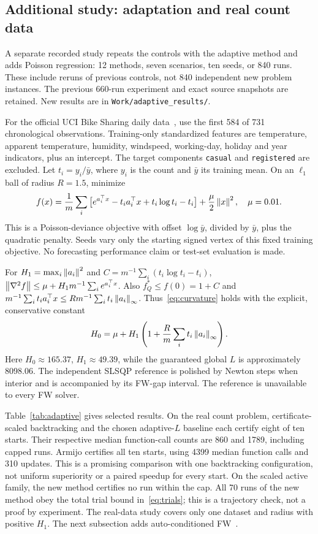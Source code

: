 \subsection{Additional study: adaptation and real count data}
A separate recorded study repeats the controls with the adaptive method
and adds Poisson regression: 12 methods, seven scenarios, ten seeds, or
840 runs. These include reruns of previous controls, not 840 independent
new problem instances. The previous 660-run experiment and exact source
snapshots are retained. New results are in \texttt{Work/adaptive\_results/}.

For the official UCI Bike Sharing daily data~\cite{bike}, use the first
584 of 731 chronological observations. Training-only standardized
features are temperature, apparent temperature, humidity, windspeed,
working-day, holiday and year indicators, plus an intercept. The target
components \texttt{casual} and \texttt{registered} are excluded.
Let $t_i=y_i/\bar y$, where $y_i$ is the count and $\bar y$ its training
mean. On an $\ell_1$ ball of radius $R=1.5$, minimize
\[
 f(x)=\frac1m\sum_i\big[e^{a_i^\top x}-t_i a_i^\top x
                         +t_i\log t_i-t_i\big]+\frac\mu2\left\|x\right\|^2,
 \quad \mu=0.01.
\]
This is a Poisson-deviance objective with offset $\log\bar y$, divided
by $\bar y$, plus the quadratic penalty. Seeds vary only the starting
signed vertex of this fixed training objective. No forecasting performance
claim or test-set evaluation is made.

For $H_1=\max_i\left\|a_i\right\|^2$ and $C=m^{-1}\sum_i(t_i\log t_i-t_i)$,
$\left\|\nabla^2f\right\|\le\mu+H_1m^{-1}\sum_i e^{a_i^\top x}$.
Also $f_Q^*\le f(0)=1+C$ and
$m^{-1}\sum_i t_i a_i^\top x\le Rm^{-1}\sum_i t_i\left\|a_i\right\|_\infty$.
Thus~\eqref{eq:curvature} holds with the explicit, conservative constant
\[
 H_0=\mu+H_1\left(1+\frac Rm\sum_i t_i\left\|a_i\right\|_\infty\right).
\]
Here $H_0\approx165.37$, $H_1\approx49.39$, while the guaranteed global
$L$ is approximately 8098.06. The independent SLSQP reference is polished
by Newton steps when interior and is accompanied by its FW-gap interval.
The reference is unavailable to every FW solver.

Table~\ref{tab:adaptive} gives selected results. On the real count
problem, certificate-scaled backtracking and the chosen adaptive-$L$
baseline each certify eight of ten starts. Their respective median
function-call counts are 860 and 1789, including capped runs.
Armijo certifies all ten starts, using 4399 median function calls and
310 updates. This is a promising comparison with one backtracking
configuration, not uniform superiority or a paired speedup for every start.
On the scaled active family, the new method certifies no run within
the cap. All 70 runs of the new method obey the total trial bound
in~\eqref{eq:trials}; this is a trajectory check, not a proof by experiment.
The real-data study covers only one dataset and radius with positive
$H_1$. The next subsection adds auto-conditioned FW~\cite{autoconditioned}.


